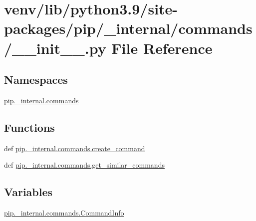 \hypertarget{venv_2lib_2python3_89_2site-packages_2pip_2__internal_2commands_2____init_____8py}{}\section{venv/lib/python3.9/site-\/packages/pip/\+\_\+internal/commands/\+\_\+\+\_\+init\+\_\+\+\_\+.py File Reference}
\label{venv_2lib_2python3_89_2site-packages_2pip_2__internal_2commands_2____init_____8py}
\subsection*{Namespaces}
\begin{DoxyCompactItemize}
\item 
 \hyperlink{namespacepip_1_1__internal_1_1commands}{pip.\+\_\+internal.\+commands}
\end{DoxyCompactItemize}
\subsection*{Functions}
\begin{DoxyCompactItemize}
\item 
def \hyperlink{namespacepip_1_1__internal_1_1commands_a47ea9893916b8604fc2ac555703b0670}{pip.\+\_\+internal.\+commands.\+create\+\_\+command}
\item 
def \hyperlink{namespacepip_1_1__internal_1_1commands_aa76da06e703ecf6a505bcd08f64bc808}{pip.\+\_\+internal.\+commands.\+get\+\_\+similar\+\_\+commands}
\end{DoxyCompactItemize}
\subsection*{Variables}
\begin{DoxyCompactItemize}
\item 
\hyperlink{namespacepip_1_1__internal_1_1commands_aef14abe5e957641834ca4926ec925cca}{pip.\+\_\+internal.\+commands.\+Command\+Info}
\end{DoxyCompactItemize}
